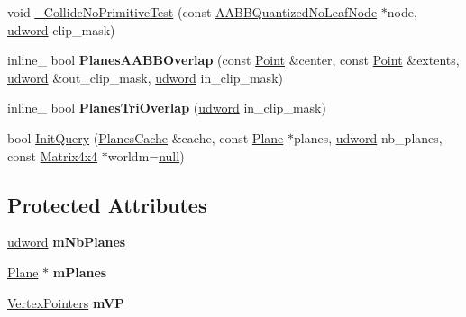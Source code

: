 \begin{DoxyCompactItemize}
void \hyperlink{classOpcode_1_1PlanesCollider_a3b4960caf24415388d68e458225bf4db}{\+\_\+\+Collide\+No\+Primitive\+Test} (const \hyperlink{classOpcode_1_1AABBQuantizedNoLeafNode}{A\+A\+B\+B\+Quantized\+No\+Leaf\+Node} $\ast$node, \hyperlink{IceTypes_8h_a44c6f1920ba5551225fb534f9d1a1733}{udword} clip\+\_\+mask)
\item 
inline\+\_\+ bool {\bfseries Planes\+A\+A\+B\+B\+Overlap} (const \hyperlink{classOpcode_1_1Point}{Point} \&center, const \hyperlink{classOpcode_1_1Point}{Point} \&extents, \hyperlink{IceTypes_8h_a44c6f1920ba5551225fb534f9d1a1733}{udword} \&out\+\_\+clip\+\_\+mask, \hyperlink{IceTypes_8h_a44c6f1920ba5551225fb534f9d1a1733}{udword} in\+\_\+clip\+\_\+mask)\hypertarget{classOpcode_1_1PlanesCollider_a8ddc2a3be3fe02e19b0f612d4bf444d4}{}\label{classOpcode_1_1PlanesCollider_a8ddc2a3be3fe02e19b0f612d4bf444d4}

\item 
inline\+\_\+ bool {\bfseries Planes\+Tri\+Overlap} (\hyperlink{IceTypes_8h_a44c6f1920ba5551225fb534f9d1a1733}{udword} in\+\_\+clip\+\_\+mask)\hypertarget{classOpcode_1_1PlanesCollider_a2021fe53d4e1e2a7d99aa228fd77d81a}{}\label{classOpcode_1_1PlanesCollider_a2021fe53d4e1e2a7d99aa228fd77d81a}

\item 
bool \hyperlink{classOpcode_1_1PlanesCollider_a1d103b95a7eff849473aa7906d6b6f54}{Init\+Query} (\hyperlink{structOpcode_1_1PlanesCache}{Planes\+Cache} \&cache, const \hyperlink{classOpcode_1_1Plane}{Plane} $\ast$planes, \hyperlink{IceTypes_8h_a44c6f1920ba5551225fb534f9d1a1733}{udword} nb\+\_\+planes, const \hyperlink{classOpcode_1_1Matrix4x4}{Matrix4x4} $\ast$worldm=\hyperlink{IceTypes_8h_ac97b8ee753e4405397a42ad5799b0f9e}{null})
\end{DoxyCompactItemize}
\subsection*{Protected Attributes}
\begin{DoxyCompactItemize}
\item 
\hyperlink{IceTypes_8h_a44c6f1920ba5551225fb534f9d1a1733}{udword} {\bfseries m\+Nb\+Planes}\hypertarget{classOpcode_1_1PlanesCollider_a71c2959125eaefd2dc6dcce32068dfc8}{}\label{classOpcode_1_1PlanesCollider_a71c2959125eaefd2dc6dcce32068dfc8}

\item 
\hyperlink{classOpcode_1_1Plane}{Plane} $\ast$ {\bfseries m\+Planes}\hypertarget{classOpcode_1_1PlanesCollider_a3a181c61c7104d825384c9c6e150b22b}{}\label{classOpcode_1_1PlanesCollider_a3a181c61c7104d825384c9c6e150b22b}

\item 
\hyperlink{structOpcode_1_1VertexPointers}{Vertex\+Pointers} {\bfseries m\+VP}\hypertarget{classOpcode_1_1PlanesCollider_a6857aa2834969b47d2693270a8d84237}{}\label{classOpcode_1_1PlanesCollider_a6857aa2834969b47d2693270a8d84237}

\end{DoxyCompactItemize}


